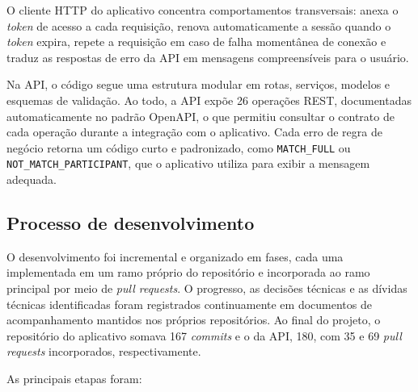 \documentclass[a4paper, 12pt]{article}
\begin{document}
\begin{justify}
O cliente HTTP do aplicativo concentra comportamentos transversais: anexa o \textit{token} de acesso a cada requisição, renova automaticamente a sessão quando o \textit{token} expira, repete a requisição em caso de falha momentânea de conexão e traduz as respostas de erro da API em mensagens compreensíveis para o usuário.

Na API, o código segue uma estrutura modular em rotas, serviços, modelos e esquemas de validação. Ao todo, a API expõe 26 operações REST, documentadas automaticamente no padrão OpenAPI, o que permitiu consultar o contrato de cada operação durante a integração com o aplicativo. Cada erro de regra de negócio retorna um código curto e padronizado, como \texttt{MATCH\_FULL} ou \texttt{NOT\_MATCH\_PARTICIPANT}, que o aplicativo utiliza para exibir a mensagem adequada.

\subsection{Processo de desenvolvimento}

O desenvolvimento foi incremental e organizado em fases, cada uma implementada em um ramo próprio do repositório e incorporada ao ramo principal por meio de \textit{pull requests}. O progresso, as decisões técnicas e as dívidas técnicas identificadas foram registrados continuamente em documentos de acompanhamento mantidos nos próprios repositórios. Ao final do projeto, o repositório do aplicativo somava 167 \textit{commits} e o da API, 180, com 35 e 69 \textit{pull requests} incorporados, respectivamente.

As principais etapas foram:


\end{justify}
\end{document}
